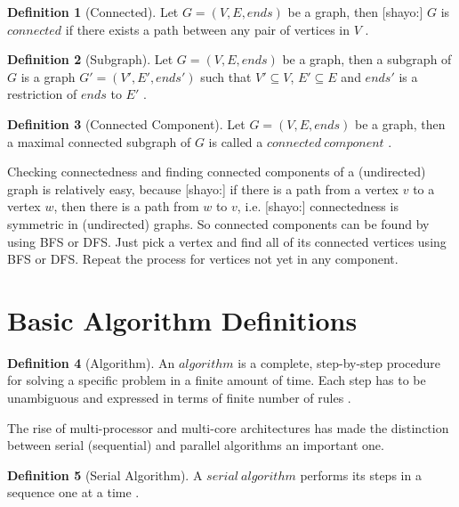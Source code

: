 \documentclass{report}
\theoremstyle{plain}
\theoremstyle{definition}
\newtheorem{definition}{Definition}
\theoremstyle{remark}
\numberwithin{definition}{chapter}
\numberwithin{example}{chapter}
\numberwithin{figure}{chapter}
\begin{document}
{\begin{definition}[Connected]
Let $G = (V, E, ends)$ be a graph, then [shayo:] $G$ is $connected$ if there exists a path between any pair of vertices in $V$ \cite{bollobas1998modern}.
\end{definition}

\begin{definition}[Subgraph]
Let $G = (V, E, ends)$ be a graph, then a subgraph of $G$ is a graph $G'=(V', E', ends')$ such that $V' \subseteq V$, $E' \subseteq E$ and $ends'$ is a restriction of $ends$ to $E'$ \cite{bondy2008graph}.
\end{definition}

\begin{definition}[Connected Component]
Let $G = (V, E, ends)$ be a graph, then a maximal connected subgraph of $G$ is called a $connected \ component$ \cite{bollobas1998modern}.
\end{definition}

Checking connectedness and finding connected components of a (undirected) graph is relatively easy, because [shayo:] if there is a path from a vertex $v$ to a vertex $w$, then there is a path from $w$ to $v$, i.e. [shayo:] connectedness is symmetric in (undirected) graphs. So connected components can be found by using BFS or DFS. Just pick a vertex and find all of its connected vertices using BFS or DFS. Repeat the process for vertices not yet in any component.

\section{Basic Algorithm Definitions}

\begin{definition}[Algorithm]
An $algorithm$ is a complete, step-by-step procedure for solving a specific problem in a finite amount of time. Each step has to be unambiguous and expressed in terms of finite number of rules \cite{berman1996fundamentals}.
\end{definition}

The rise of multi-processor and multi-core architectures has made the distinction between serial (sequential) and parallel algorithms an important one.

\begin{definition}[Serial Algorithm]
A $serial \ algorithm$ performs its steps in a sequence one at a time \cite{berman1996fundamentals}.
\end{definition}

}
\end{document}
